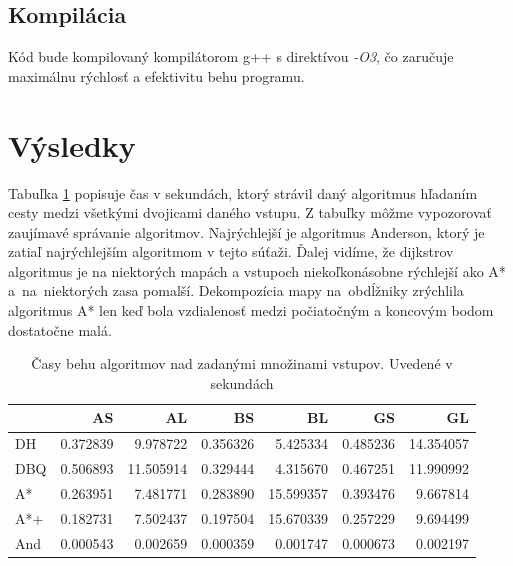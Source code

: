 \subsection{Kompilácia}
Kód bude kompilovaný kompilátorom g++ s direktívou \emph{-O3}, čo zaručuje maximálnu rýchlosť a efektivitu behu programu.


\section{Výsledky}
Tabuľka \ref{fig:totaltime_result} popisuje čas v sekundách, ktorý strávil daný algoritmus hľadaním cesty medzi všetkými dvojicami daného vstupu. Z tabuľky môžme vypozorovať  zaujímavé správanie algoritmov. Najrýchlejší je 
algoritmus Anderson, ktorý je zatiaľ najrýchlejším algoritmom v tejto súťaži.
Ďalej vidíme, že dijkstrov algoritmus je na niektorých mapách a vstupoch niekoľkonásobne rýchlejší ako A* a~na~niektorých zasa pomalší.
Dekompozícia mapy na~obdĺžniky zrýchlila algoritmus A* len keď bola vzdialenosť medzi počiatočným a koncovým bodom dostatočne malá.



\begin{table}[H]
	\centering
	\begin{tabular}{|l | r|r|r|r|r|r|}
	\hline
	  & AS & AL & BS & BL & GS & GL \\
	\hline
	DH & 0.372839 & 9.978722 & 0.356326 & 5.425334 & 0.485236 & 14.354057 \\
	DBQ & 0.506893 & 11.505914 &  0.329444 & 4.315670 & 0.467251 & 11.990992 \\
	A* & 0.263951 & 7.481771 & 0.283890 & 15.599357 & 0.393476 & 9.667814 \\
	A*+  & 0.182731 & 7.502437 &  0.197504 & 15.670339 & 0.257229 & 9.694499\\
	And  &  0.000543 & 0.002659 & 0.000359 & 0.001747 & 0.000673& 0.002197\\
	\hline
	\end{tabular}
	\caption{Časy behu algoritmov nad zadanými množinami vstupov. Uvedené v sekundách}
	\label{fig:totaltime_result}
\end{table}

